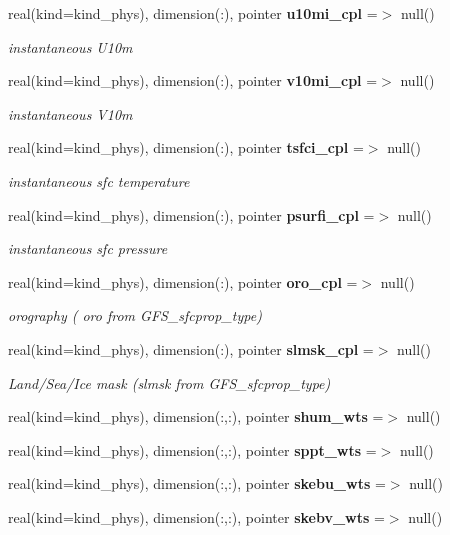 \begin{DoxyCompactItemize}
real(kind=kind\+\_\+phys), dimension(\+:), pointer \textbf{ u10mi\+\_\+cpl} =$>$ null()
\begin{DoxyCompactList}\small\item\em instantaneous U10m \end{DoxyCompactList}\item 
real(kind=kind\+\_\+phys), dimension(\+:), pointer \textbf{ v10mi\+\_\+cpl} =$>$ null()
\begin{DoxyCompactList}\small\item\em instantaneous V10m \end{DoxyCompactList}\item 
real(kind=kind\+\_\+phys), dimension(\+:), pointer \textbf{ tsfci\+\_\+cpl} =$>$ null()
\begin{DoxyCompactList}\small\item\em instantaneous sfc temperature \end{DoxyCompactList}\item 
real(kind=kind\+\_\+phys), dimension(\+:), pointer \textbf{ psurfi\+\_\+cpl} =$>$ null()
\begin{DoxyCompactList}\small\item\em instantaneous sfc pressure \end{DoxyCompactList}\item 
real(kind=kind\+\_\+phys), dimension(\+:), pointer \textbf{ oro\+\_\+cpl} =$>$ null()
\begin{DoxyCompactList}\small\item\em orography ( oro from G\+F\+S\+\_\+sfcprop\+\_\+type) \end{DoxyCompactList}\item 
real(kind=kind\+\_\+phys), dimension(\+:), pointer \textbf{ slmsk\+\_\+cpl} =$>$ null()
\begin{DoxyCompactList}\small\item\em Land/\+Sea/\+Ice mask (slmsk from G\+F\+S\+\_\+sfcprop\+\_\+type) \end{DoxyCompactList}\item 
real(kind=kind\+\_\+phys), dimension(\+:,\+:), pointer \textbf{ shum\+\_\+wts} =$>$ null()
\item 
real(kind=kind\+\_\+phys), dimension(\+:,\+:), pointer \textbf{ sppt\+\_\+wts} =$>$ null()
\item 
real(kind=kind\+\_\+phys), dimension(\+:,\+:), pointer \textbf{ skebu\+\_\+wts} =$>$ null()
\item 
real(kind=kind\+\_\+phys), dimension(\+:,\+:), pointer \textbf{ skebv\+\_\+wts} =$>$ null()

\end{DoxyCompactItemize}
